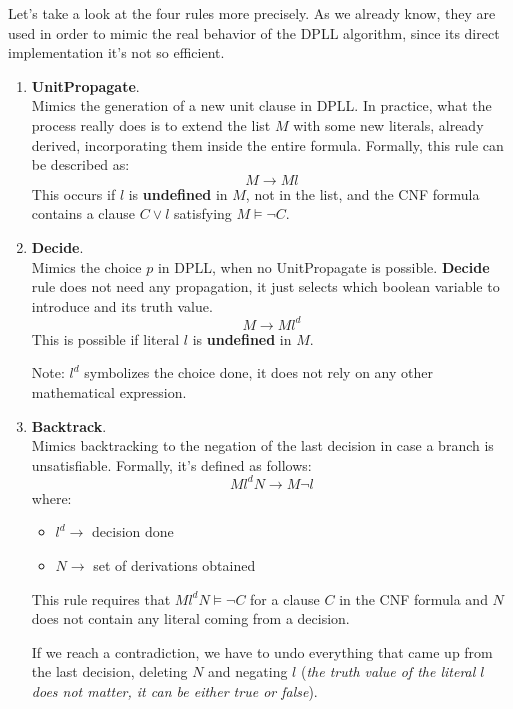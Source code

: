 Let's take a look at the four rules more precisely. As we already know, they are used in order to mimic the real behavior of the DPLL algorithm, since its
direct implementation it's not so efficient.
\begin{enumerate}
    \item \textbf{UnitPropagate}. \\ 
    Mimics the generation of a new unit clause in DPLL. In practice, what the process really does is to extend the list $M$ with some new literals, 
    already derived, incorporating them inside the entire formula. Formally, this rule can be described as:
    $$ M \rightarrow Ml $$
    This occurs if $l$ is \textbf{undefined} in $M$, not in the list, and the CNF formula contains a clause $C \vee l$ satisfying $M \models \neg C$.
    \item \textbf{Decide}. \\ 
    Mimics the choice $p$ in DPLL, when no UnitPropagate is possible. \textbf{Decide} rule does not need any propagation, it just selects which
    boolean variable to introduce and its truth value.
    $$ M \rightarrow Ml^d $$
    This is possible if literal $l$ is \textbf{undefined} in $M$. \vspace{7pt}

    Note: $l^d$ symbolizes the choice done, it does not rely on any other mathematical expression.
    \item \textbf{Backtrack}. \\ 
    Mimics backtracking to the negation of the last decision in case a branch is unsatisfiable. Formally, it's defined as follows:
    $$ Ml^dN \rightarrow M \neg l $$
    where:
    \begin{itemize}
        \renewcommand{\labelitemi}{-}
        \item $l^d \rightarrow$ decision done
        \item $N \rightarrow$ set of derivations obtained
    \end{itemize} \vspace{3.5pt}

    This rule requires that $Ml^dN \models \neg C$ for a clause $C$ in the CNF formula and $N$ does not contain any literal coming from a decision. \vspace{7pt}

    If we reach a contradiction, we have to undo everything that came up from the last decision, deleting $N$ and negating $l$ (\textit{the truth value of the 
    literal $l$ does not matter, it can be either true or false}). \vspace{7pt}


\end{enumerate}
